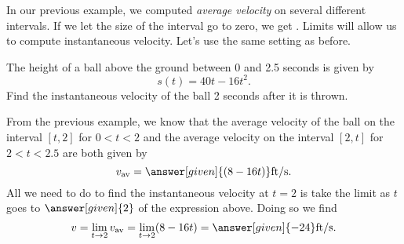 \documentclass{ximera}
\begin{document}
In our previous example, we computed \textit{average velocity} on
several different intervals. If we let the size of the interval go to
zero, we get . Limits will allow us to
compute instantaneous velocity.  Let's use the same setting as before.

\begin{example}
The height of a ball above the ground between 0 and 2.5 seconds
is given by
\[
s(t) = 40t - 16t^2.
\] 
Find the instantaneous velocity of the ball 2 seconds after it
is thrown.
\begin{explanation}
From the previous example, we know that the average velocity of the
ball on the interval $[t,2]$ for $0<t<2$ and the average velocity
on the interval $[2,t]$ for $2<t<2.5$ are both given by
\[
v_{\text{av}} = \answer[given]{(8-16t)}\text{ft/s.}
\]
All we need to do to find the instantaneous velocity at $t=2$ is 
take the limit as $t$ goes to $\answer[given]{2}$ of the expression
above.  Doing so we find
\[
v = \lim_{t\to2}v_{\text{av}}
= \lim_{t\to2}(8-16t)
= \answer[given]{-24}\text{ft/s.}
\]
\end{explanation}
\end{example}
\end{document}

